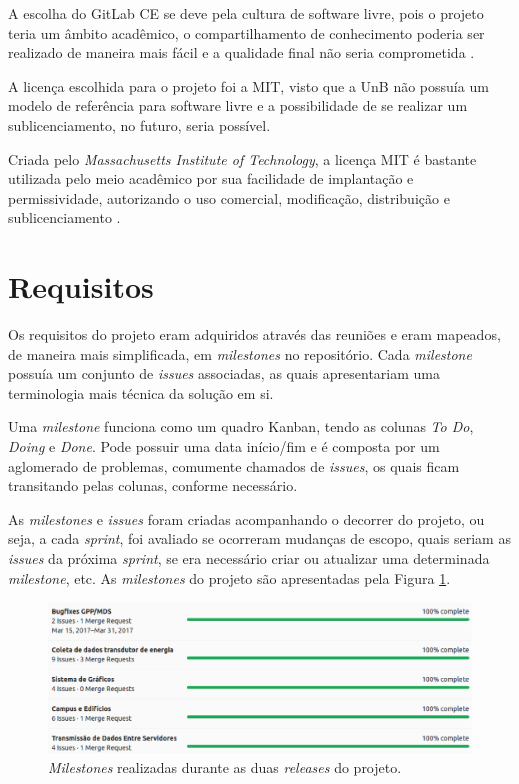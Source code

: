 A escolha do GitLab CE se deve pela cultura de software livre, pois o projeto teria um âmbito acadêmico, o compartilhamento de conhecimento poderia ser realizado de maneira mais fácil e a qualidade final não seria comprometida \cite{raymond1999}.

A licença escolhida para o projeto foi a MIT, visto que a UnB não possuía um modelo de referência para software livre e a possibilidade de se realizar um sublicenciamento, no futuro, seria possível.

Criada pelo \textit{Massachusetts Institute of Technology}, a licença MIT é bastante utilizada pelo meio acadêmico por sua facilidade de implantação e permissividade, autorizando o uso comercial, modificação, distribuição e sublicenciamento \cite{mit_license}.

\section{Requisitos}
Os requisitos do projeto eram adquiridos através das reuniões e eram mapeados, de maneira mais simplificada, em \textit{milestones} \cite{gitlab} no repositório. Cada \textit{milestone} possuía um conjunto de \textit{issues} associadas, as quais apresentariam uma terminologia mais técnica da solução em si.

Uma \textit{milestone} funciona como um quadro Kanban, tendo as colunas \textit{To Do}, \textit{Doing} e \textit{Done}. Pode possuir uma data início/fim e é composta por um aglomerado de problemas, comumente chamados de \textit{issues}, os quais ficam transitando pelas colunas, conforme necessário.

As \textit{milestones} e \textit{issues} foram criadas acompanhando o decorrer do projeto, ou seja, a cada \textit{sprint}, foi avaliado se ocorreram mudanças de escopo, quais seriam as \textit{issues} da próxima \textit{sprint}, se era necessário criar ou atualizar uma determinada \textit{milestone}, etc. As \textit{milestones} do projeto são apresentadas pela Figura \ref{milestones}.

\begin{figure}[!htb]
    \centering
    \includegraphics[keepaspectratio=true,scale=0.51]{figuras/milestones.eps}
    \caption{\textit{Milestones} realizadas durante as duas \textit{releases} do projeto.}
    \label{milestones}
\end{figure}

